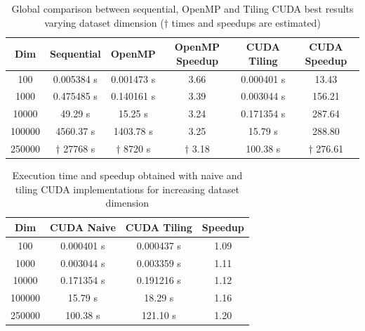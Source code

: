\documentclass[10pt,twocolumn,letterpaper]{article}
\begin{document}
\begin{table}[]
\centering
\begin{tabular}{|c|c|c|c|c|c|c|}
\hline
\textbf{Dim} & \multicolumn{2}{c|}{\textbf{Sequential}} & \textbf{OpenMP} & \textbf{OpenMP Speedup} & \textbf{CUDA Tiling} & \textbf{CUDA Speedup} \\ \hline
100 & \multicolumn{2}{c|}{0.005384 s} & 0.001473 s & 3.66 & 0.000401 s & 13.43 \\ \hline
1000 & \multicolumn{2}{c|}{0.475485 s} & 0.140161 s & 3.39 & 0.003044 s & 156.21 \\ \hline
10000 & \multicolumn{2}{c|}{49.29 s} & 15.25 s & 3.24 & 0.171354 s & 287.64 \\ \hline
100000 & \multicolumn{2}{c|}{4560.37 s} & 1403.78 s & 3.25 & 15.79 s & 288.80 \\ \hline
250000 & \multicolumn{2}{c|}{$\dagger$ 27768 s} & $\dagger$ 8720 s & $\dagger$ 3.18 & 100.38 s & $\dagger$ 276.61 \\ \hline
\end{tabular}
\caption{Global comparison between sequential, OpenMP and Tiling CUDA best results varying dataset dimension ($\dagger$ times and speedups are estimated)}
\label{tab:globalComparison}
\end{table}

\begin{table}[]
\centering
\begin{tabular}{|c|c|c|c|}
\hline
\textbf{Dim} & \textbf{CUDA Naive} & \textbf{CUDA Tiling} & \textbf{Speedup} \\ \hline
100 & 0.000401 s & 0.000437 s & 1.09 \\ \hline
1000 & 0.003044 s & 0.003359 s & 1.11 \\ \hline
10000 & 0.171354 s & 0.191216 s & 1.12 \\ \hline
100000 & 15.79 s & 18.29 s & 1.16 \\ \hline
250000 & 100.38 s & 121.10 s & 1.20 \\ \hline
\end{tabular}
\caption{Execution time and speedup obtained with naive and tiling CUDA implementations for increasing dataset dimension}
\label{tab:naiveTilingSpeedup}
\end{table}
\end{document}
